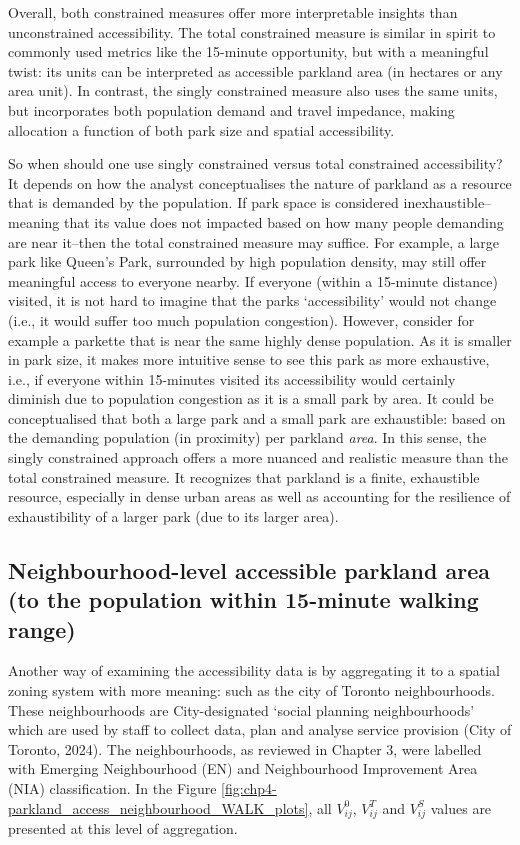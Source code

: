 \documentclass[
11pt, %
oneside, %
english, %
singlespacing, %
]{macthesis} %
\begin{document}
Overall, both constrained measures offer more interpretable insights than unconstrained accessibility. The total constrained measure is similar in spirit to commonly used metrics like the 15-minute opportunity, but with a meaningful twist: its units can be interpreted as accessible parkland area (in hectares or any area unit). In contrast, the singly constrained measure also uses the same units, but incorporates both population demand and travel impedance, making allocation a function of both park size and spatial accessibility.

So when should one use singly constrained versus total constrained accessibility? It depends on how the analyst conceptualises the nature of parkland as a resource that is demanded by the population. If park space is considered inexhaustible--meaning that its value does not impacted based on how many people demanding are near it--then the total constrained measure may suffice. For example, a large park like Queen's Park, surrounded by high population density, may still offer meaningful access to everyone nearby. If everyone (within a 15-minute distance) visited, it is not hard to imagine that the parks `accessibility' would not change (i.e., it would suffer too much population congestion). However, consider for example a parkette that is near the same highly dense population. As it is smaller in park size, it makes more intuitive sense to see this park as more exhaustive, i.e., if everyone within 15-minutes visited its accessibility would certainly diminish due to population congestion as it is a small park by area. It could be conceptualised that both a large park and a small park are exhaustible: based on the demanding population (in proximity) per parkland \emph{area}. In this sense, the singly constrained approach offers a more nuanced and realistic measure than the total constrained measure. It recognizes that parkland is a finite, exhaustible resource, especially in dense urban areas as well as accounting for the resilience of exhaustibility of a larger park (due to its larger area).

\subsection{Neighbourhood-level accessible parkland area (to the population within 15-minute walking range)}\label{neighbourhood-level-accessible-parkland-area-to-the-population-within-15-minute-walking-range}

Another way of examining the accessibility data is by aggregating it to a spatial zoning system with more meaning: such as the city of Toronto neighbourhoods. These neighbourhoods are City-designated `social planning neighbourhoods' which are used by staff to collect data, plan and analyse service provision (City of Toronto, 2024). The neighbourhoods, as reviewed in Chapter 3, were labelled with Emerging Neighbourhood (EN) and Neighbourhood Improvement Area (NIA) classification. In the Figure \ref{fig:chp4-parkland_access_neighbourhood_WALK_plots}, all \(V^0_{ij}\), \(V^T_{ij}\) and \(V^S_{ij}\) values are presented at this level of aggregation.
\end{document}
